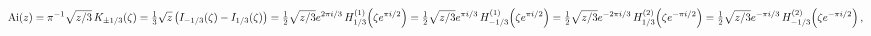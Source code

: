 \[\mathop{\mathrm{Ai}\/}\nolimits\!\left(z\right)=\pi^{-1}\sqrt{z/3}\mathop{K_{%
\pm 1/3}\/}\nolimits\!\left(\zeta\right)=\tfrac{1}{3}\sqrt{z}\left(\mathop{I_{%
-1/3}\/}\nolimits\!\left(\zeta\right)-\mathop{I_{1/3}\/}\nolimits\!\left(\zeta%
\right)\right)=\tfrac{1}{2}\sqrt{z/3}e^{2\pi i/3}\mathop{{H^{(1)}_{1/3}}\/}%
\nolimits\!\left(\zeta e^{\pi i/2}\right)=\tfrac{1}{2}\sqrt{z/3}e^{\pi i/3}%
\mathop{{H^{(1)}_{-1/3}}\/}\nolimits\!\left(\zeta e^{\pi i/2}\right)=\tfrac{1}%
{2}\sqrt{z/3}e^{-2\pi i/3}\mathop{{H^{(2)}_{1/3}}\/}\nolimits\!\left(\zeta e^{%
-\pi i/2}\right)=\tfrac{1}{2}\sqrt{z/3}e^{-\pi i/3}\mathop{{H^{(2)}_{-1/3}}\/}%
\nolimits\!\left(\zeta e^{-\pi i/2}\right),\]